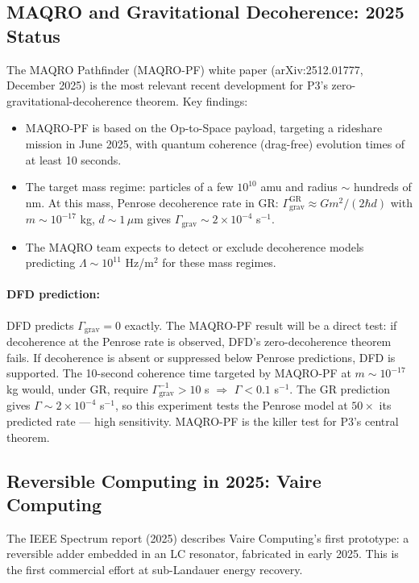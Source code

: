 \documentclass[11pt]{article}
\theoremstyle{definition}
\theoremstyle{remark}
\begin{document}
\subsection{MAQRO and Gravitational Decoherence: 2025 Status}

The MAQRO Pathfinder (MAQRO-PF) white paper (arXiv:2512.01777, December 2025)
is the most relevant recent development for P3's zero-gravitational-decoherence
theorem. Key findings:

\begin{itemize}
\item MAQRO-PF is based on the Op-to-Space payload, targeting a rideshare
mission in June 2025, with quantum coherence (drag-free) evolution times of
at least 10 seconds.
\item The target mass regime: particles of a few $10^{10}$ amu and radius
$\sim$ hundreds of nm. At this mass, Penrose decoherence rate in GR:
$\Gamma_{\mathrm{grav}}^{\mathrm{GR}} \approx G m^2/(2\hbar d)$ with $m \sim
10^{-17}$ kg, $d \sim 1\,\mu$m gives $\Gamma_{\mathrm{grav}} \sim 2\times
10^{-4}$ s$^{-1}$.
\item The MAQRO team expects to detect or exclude decoherence models predicting
$\Lambda \sim 10^{11}$ Hz/m$^2$ for these mass regimes.
\end{itemize}

\paragraph{DFD prediction:} DFD predicts $\Gamma_{\mathrm{grav}} = 0$ exactly.
The MAQRO-PF result will be a direct test: if decoherence at the Penrose rate
is observed, DFD's zero-decoherence theorem fails. If decoherence is absent or
suppressed below Penrose predictions, DFD is supported. The 10-second coherence
time targeted by MAQRO-PF at $m \sim 10^{-17}$ kg would, under GR,
require $\Gamma_{\mathrm{grav}}^{-1} > 10$ s $\Rightarrow$ $\Gamma < 0.1$
s$^{-1}$. The GR prediction gives $\Gamma \sim 2\times 10^{-4}$ s$^{-1}$,
so this experiment tests the Penrose model at $50\times$ its predicted rate
--- high sensitivity. MAQRO-PF is the killer test for P3's central theorem.

\subsection{Reversible Computing in 2025: Vaire Computing}

The IEEE Spectrum report (2025) describes Vaire Computing's first prototype:
a reversible adder embedded in an LC resonator, fabricated in early 2025.
This is the first commercial effort at sub-Landauer energy recovery.
\end{document}
